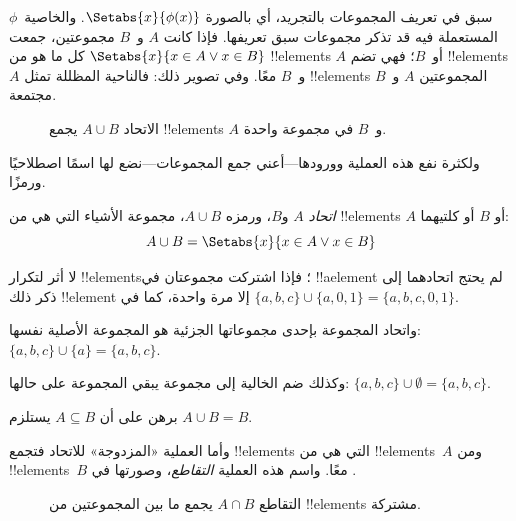\documentclass[../../../include/open-logic-section]{subfiles}
\begin{document}

\begin{explain}
سبق في  تعريف المجموعات بالتجريد، أي بالصورة
$\Setabs{x}{\phi(x)}$. والخاصية~$\phi$ المستعملة فيه قد تذكر مجموعات
سبق تعريفها. فإذا كانت $A$ و~$B$ مجموعتين، جمعت
$\Setabs{x}{x \in A \lor x \in B}$ كل ما هو من !!{element}s $A$ أو~$B$؛
فهي تضم !!{element}s $A$ و~$B$ معًا. وفي  تصوير ذلك:
فالناحية المظللة تمثل !!{element}s المجموعتين $A$ و~$B$ مجتمعة.

\begin{figure}
  \caption{الاتحاد $A \cup B$ يجمع !!{element}s $A$ و~$B$ في مجموعة واحدة.}
\end{figure}

ولكثرة نفع هذه العملية وورودها---أعني جمع المجموعات---نضع لها اسمًا
اصطلاحيًا ورمزًا.
\end{explain}

\begin{defn}[الاتحاد]
\emph{اتحاد} $A$ و$B$، ورمزه $A \cup B$، مجموعة الأشياء التي هي من !!{element}s $A$ أو $B$
أو كلتيهما:
\[
A \cup B = \Setabs{x}{x \in A \lor x \in B}
\]
\end{defn}

\begin{ex}
لا أثر لتكرار !!{element}s؛ فإذا اشتركت مجموعتان في !!a{element}
لم يحتج اتحادهما إلى ذكر ذلك !!{element} إلا مرة واحدة، كما في
$\{ a, b, c\} \cup \{ a, 0, 1\} = \{a, b, c, 0, 1\}$.

واتحاد المجموعة بإحدى مجموعاتها الجزئية هو المجموعة الأصلية نفسها: $\{a,
b, c \} \cup \{a \} = \{a, b, c\}$.

وكذلك ضم الخالية إلى مجموعة يبقي المجموعة على حالها: $\{a,
b, c \} \cup \emptyset = \{a, b, c \}$.
\end{ex}

\begin{prob}
برهن على أن $A \subseteq B$ يستلزم $A \cup B = B$.
\end{prob}

\begin{explain}
وأما العملية «المزدوجة» للاتحاد فتجمع !!{element}s التي هي من
!!{element}s~$A$ ومن !!{element}s~$B$ معًا. واسم هذه العملية
\emph{التقاطع}، وصورتها في .
\begin{figure}
  \caption{التقاطع $A \cap B$ يجمع ما بين المجموعتين من !!{element}s مشتركة.}
\end{figure}
\end{explain}
\end{document}
